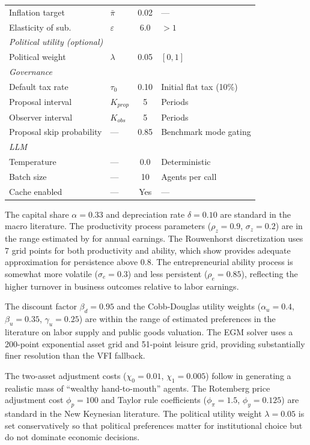 \documentclass[12pt]{article}
\begin{document}
\begin{table}[tp]
\begin{tabular}{@{}llcl@{}}
Inflation target & $\bar{\pi}$ & 0.02 & --- \\
Elasticity of sub. & $\varepsilon$ & 6.0 & $> 1$ \\
\midrule
\multicolumn{4}{l}{\textit{Political utility (optional)}} \\
Political weight & $\lambda$ & 0.05 & $[0, 1]$ \\
\midrule
\multicolumn{4}{l}{\textit{Governance}} \\
Default tax rate & $\tau_0$ & 0.10 & Initial flat tax (10\%) \\
Proposal interval & $K_{prop}$ & 5 & Periods \\
Observer interval & $K_{obs}$ & 5 & Periods \\
Proposal skip probability & --- & 0.85 & Benchmark mode gating \\
\midrule
\multicolumn{4}{l}{\textit{LLM}} \\
Temperature & --- & 0.0 & Deterministic \\
Batch size & --- & 10 & Agents per call \\
Cache enabled & --- & Yes & --- \\
\bottomrule
\end{tabular}
\end{table}

The capital share $\alpha = 0.33$ and depreciation rate $\delta = 0.10$ are standard in the macro literature. The productivity process parameters ($\rho_z = 0.9$, $\sigma_z = 0.2$) are in the range estimated by \citet{storesletten2004} for annual earnings. The Rouwenhorst discretization uses 7 grid points for both productivity and ability, which \citet{kopeckysuen2010} show provides adequate approximation for persistence above 0.8. The entrepreneurial ability process is somewhat more volatile ($\sigma_e = 0.3$) and less persistent ($\rho_e = 0.85$), reflecting the higher turnover in business outcomes relative to labor earnings.

The discount factor $\beta_d = 0.95$ and the Cobb-Douglas utility weights ($\alpha_u = 0.4$, $\beta_u = 0.35$, $\gamma_u = 0.25$) are within the range of estimated preferences in the literature on labor supply and public goods valuation. The EGM solver uses a 200-point exponential asset grid and 51-point leisure grid, providing substantially finer resolution than the VFI fallback.

The two-asset adjustment costs ($\chi_0 = 0.01$, $\chi_1 = 0.005$) follow \citet{kaplanmollviolante2018} in generating a realistic mass of ``wealthy hand-to-mouth'' agents. The Rotemberg price adjustment cost $\phi_p = 100$ and Taylor rule coefficients ($\phi_\pi = 1.5$, $\phi_y = 0.125$) are standard in the New Keynesian literature. The political utility weight $\lambda = 0.05$ is set conservatively so that political preferences matter for institutional choice but do not dominate economic decisions.
\end{document}
